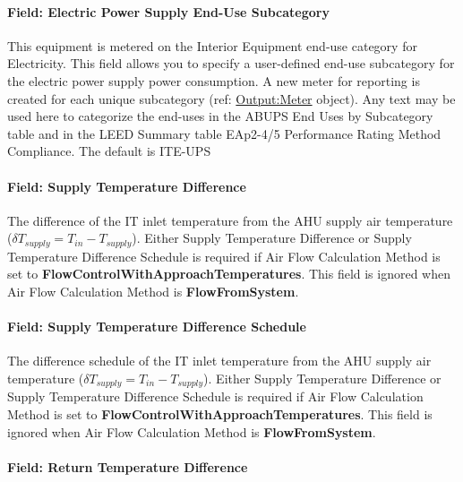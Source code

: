 \paragraph{Field: Electric Power Supply End-Use Subcategory}\label{field-electric-power-supply-end-use-subcategory}

This equipment is metered on the Interior Equipment end-use category for Electricity. This field allows you to specify a user-defined end-use subcategory for the electric power supply power consumption. A new meter for reporting is created for each unique subcategory (ref: \hyperref[outputmeter-and-outputmetermeterfileonly]{Output:Meter} object). Any text may be used here to categorize the end-uses in the ABUPS End Uses by Subcategory table and in the LEED Summary table EAp2-4/5 Performance Rating Method Compliance. The default is ITE-UPS

\paragraph{Field: Supply Temperature Difference}\label{field-supply-temperature-difference}

The difference of the IT inlet temperature from the AHU supply air temperature ($\delta T_{supply} = T_{in}-T_{supply}$). Either Supply Temperature Difference or Supply Temperature Difference Schedule is required if Air Flow Calculation Method is set to \textbf{FlowControlWithApproachTemperatures}. This field is ignored when Air Flow Calculation Method is \textbf{FlowFromSystem}.

\paragraph{Field: Supply Temperature Difference Schedule}\label{field-supply-temperature-difference-schedule}

The difference schedule of the IT inlet temperature from the AHU supply air temperature ($\delta T_{supply} = T_{in}-T_{supply}$). Either Supply Temperature Difference or Supply Temperature Difference Schedule is required if Air Flow Calculation Method is set to \textbf{FlowControlWithApproachTemperatures}. This field is ignored when Air Flow Calculation Method is \textbf{FlowFromSystem}.

\paragraph{Field: Return Temperature Difference}\label{field-return-temperature-difference}

